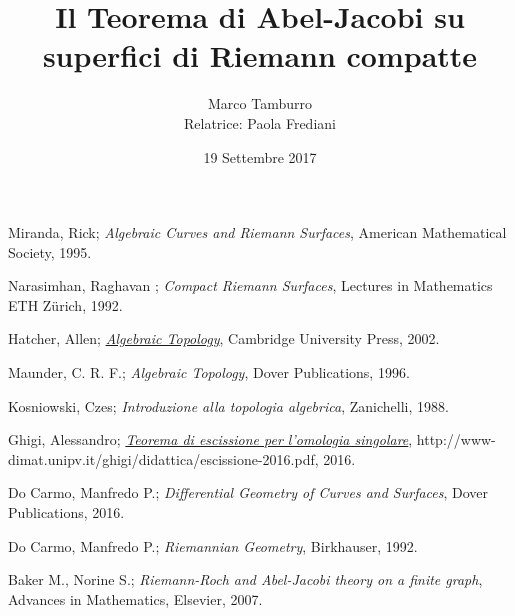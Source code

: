 \documentclass[a4paper,12pt]{book}
\author{Marco Tamburro \\ Relatrice: Paola Frediani}
\title{Il Teorema di Abel-Jacobi su \\superfici di Riemann compatte}
\date{19 Settembre 2017}
\theoremstyle{definition}
\theoremstyle{remark}
\begin{document}
\frontmatter

\tableofcontents



\mainmatter






\backmatter


\clearpage
\begin{thebibliography}{11} 
	 Miranda, Rick; {\em Algebraic Curves and Riemann Surfaces},  American Mathematical Society, 1995. 
	
	 Narasimhan, Raghavan ; {\em Compact Riemann Surfaces}, Lectures in Mathematics ETH Zürich, 1992.
		
	 Hatcher, Allen; \href{https://www.math.cornell.edu/~hatcher/AT/ATpage.html}{{\em Algebraic Topology}},  Cambridge University Press, 2002. 
	
	 Maunder, C. R. F.;  {\em Algebraic Topology}, Dover Publications, 1996. 	
	
	 Kosniowski, Czes; {\em Introduzione alla topologia algebrica}, Zanichelli, 1988.
	
	 Ghigi, Alessandro; \href{http://www-dimat.unipv.it/ghigi/didattica/escissione-2016.pdf}{{\em Teorema di escissione per l’omologia singolare}}, http://www-dimat.unipv.it/ghigi/didattica/escissione-2016.pdf, 2016.
	
	 Do Carmo, Manfredo P.; {\em Differential Geometry of Curves and Surfaces}, Dover Publications, 2016.
	
	 Do Carmo, Manfredo P.; {\em Riemannian Geometry}, Birkhauser, 1992.
	
	 Baker M., Norine S.; {\em Riemann-Roch and Abel-Jacobi theory on a finite graph}, Advances in Mathematics, Elsevier, 2007.
	
	

\end{thebibliography}
%
\end{document}

